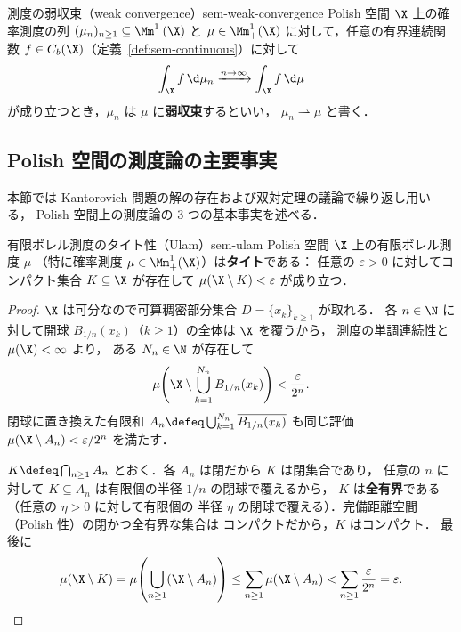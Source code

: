 \begin{definition}{測度の弱収束（weak convergence）}{sem-weak-convergence}
  Polish 空間 $\X$ 上の確率測度の列 $(\mu_n)_{n \geq 1} \subseteq \Mm_+^1(\X)$ と
  $\mu \in \Mm_+^1(\X)$ に対して，任意の有界連続関数
  $f \in C_b(\X)$（定義~\ref{def:sem-continuous}）に対して
  \[
    \int_\X f \, \d\mu_n \xrightarrow{n \to \infty} \int_\X f \, \d\mu
  \]
  が成り立つとき，$\mu_n$ は $\mu$ に\textbf{弱収束}するといい，
  $\mu_n \rightharpoonup \mu$ と書く．
\end{definition}

\subsection{Polish 空間の測度論の主要事実}
\label{sec:sem-polish-theorems}

本節では Kantorovich 問題の解の存在および双対定理の議論で繰り返し用いる，
Polish 空間上の測度論の 3 つの基本事実を述べる．

\begin{proposition}{有限ボレル測度のタイト性（Ulam）}{sem-ulam}
  Polish 空間 $\X$ 上の有限ボレル測度 $\mu$
  （特に確率測度 $\mu \in \Mm_+^1(\X)$）は\textbf{タイト}である：
  任意の $\varepsilon > 0$ に対してコンパクト集合 $K \subseteq \X$ が存在して
  $\mu(\X \setminus K) < \varepsilon$ が成り立つ．
\end{proposition}

\begin{proof}
  $\X$ は可分なので可算稠密部分集合 $D = \{x_k\}_{k \geq 1}$ が取れる．
  各 $n \in \N$ に対して開球 $B_{1/n}(x_k)$（$k \geq 1$）の全体は $\X$ を覆うから，
  測度の単調連続性と $\mu(\X) < \infty$ より，
  ある $N_n \in \N$ が存在して
  \[
    \mu\!\left(\X \setminus \bigcup_{k=1}^{N_n} B_{1/n}(x_k)\right)
    < \frac{\varepsilon}{2^n}.
  \]
  閉球に置き換えた有限和
  \(
    A_n \defeq \bigcup_{k=1}^{N_n} \overline{B_{1/n}(x_k)}
  \)
  も同じ評価 $\mu(\X \setminus A_n) < \varepsilon / 2^n$ を満たす．

  $K \defeq \bigcap_{n \geq 1} A_n$ とおく．各 $A_n$ は閉だから $K$ は閉集合であり，
  任意の $n$ に対して $K \subseteq A_n$ は有限個の半径 $1/n$ の閉球で覆えるから，
  $K$ は\textbf{全有界}である（任意の $\eta > 0$ に対して有限個の
  半径 $\eta$ の閉球で覆える）．完備距離空間（Polish 性）の閉かつ全有界な集合は
  コンパクトだから，$K$ はコンパクト．
  最後に
  \[
    \mu(\X \setminus K)
    = \mu\!\left(\bigcup_{n \geq 1} (\X \setminus A_n)\right)
    \leq \sum_{n \geq 1} \mu(\X \setminus A_n)
    < \sum_{n \geq 1} \frac{\varepsilon}{2^n}
    = \varepsilon.
  \]
\end{proof}

